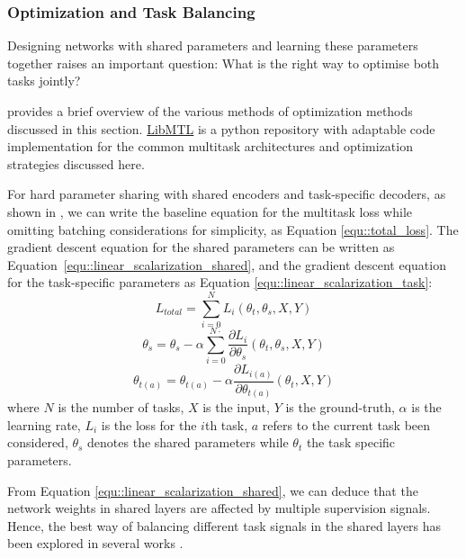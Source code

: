 \subsubsection{Optimization and Task Balancing} \label{subsec::optimization_and_task_balancing}
Designing networks with shared parameters and learning these parameters together raises an important question: What is the right way to optimise both tasks jointly?

 provides a brief overview of the various methods of optimization methods discussed in this section. \href{https://github.com/median-research-group/LibMTL}{LibMTL}\citep{lin2023libmtl} is a python repository with adaptable code implementation for the common multitask architectures and optimization strategies discussed here.

For hard parameter sharing with shared encoders and task-specific decoders, as shown in  , we can write the baseline equation for the multitask loss while omitting batching considerations for simplicity, as Equation \eqref{equ::total_loss}. 
The gradient descent equation for the shared parameters can be written as Equation~\eqref{equ::linear_scalarization_shared}, and the gradient descent equation for the task-specific parameters as Equation \eqref{equ::linear_scalarization_task}:
\begin{equation} \label{equ::total_loss}
    L_{total}=\sum ^{N}_{i=0}L_{i}\left( \theta _{t},\theta _{s},X,Y\right)
\end{equation}
\begin{equation} \label{equ::linear_scalarization_shared}
    \theta _{s}=\theta_{s}-\alpha \sum ^{N\cdot }_{i=0}\dfrac{\partial L_{i}}{\partial \theta _{s}}\left( \theta _{t},\theta _{s},X,Y\right)
\end{equation}
\begin{equation} \label{equ::linear_scalarization_task}
    \theta _{t\left( a\right) }=\theta_{t\left( a\right) }-\alpha \dfrac{\partial L_{i\left( a\right)} }{\partial \theta _{t\left( a\right)} }\left( \theta _{t},X,Y\right)
\end{equation}
where $N$ is the number of tasks, $X$ is the input, $Y$ is the ground-truth, $\alpha$ is the learning rate, $L_i$ is the loss for the $i$th task, $a$ refers to the current task been considered,  $\theta _{s}$ denotes the shared parameters while $\theta _{t}$ the task specific parameters. 

From Equation \eqref{equ::linear_scalarization_shared}, we can deduce that the network weights in shared layers are affected by multiple supervision signals. Hence, the best way of balancing different task signals in the shared layers has been explored in several works \citep{MTMO_koltun,uncertainty_weighting,Dynamic_task_prioritization}.

